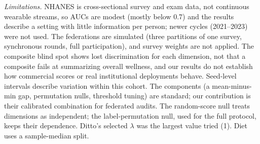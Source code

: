 \emph{Limitations.} NHANES is cross-sectional survey and exam data, not continuous wearable streams, so AUCs are modest (mostly below 0.7) and the results describe a setting with little information per person; newer cycles (2021--2023) were not used. The federations are simulated (three partitions of one survey, synchronous rounds, full participation), and survey weights are not applied. The composite blind spot shows lost discrimination for each dimension, not that a composite fails at summarizing overall wellness, and our results do not establish how commercial scores or real institutional deployments behave. Seed-level intervals describe variation within this cohort. The components (a mean-minus-min gap, permutation nulls, threshold tuning) are standard; our contribution is their calibrated combination for federated audits. The random-score null treats dimensions as independent; the label-permutation null, used for the full protocol, keeps their dependence. Ditto's selected $\lambda$ was the largest value tried (1). Diet uses a sample-median split.
